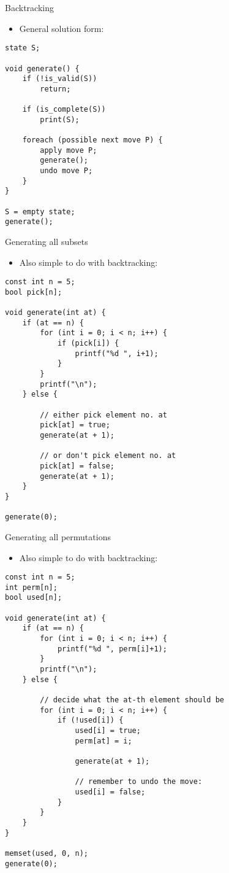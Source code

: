 \documentclass[12pt,t]{beamer}
\newcommand{\bi}{\begin{itemize}}
\newcommand{\ei}{\end{itemize}}
\begin{document}
\begin{frame}[fragile]{Backtracking}
    \vspace{10pt}
    \bi
        \item General solution form:
    \ei

    \begin{verbatim}
state S;

void generate() {
    if (!is_valid(S))
        return;

    if (is_complete(S))
        print(S);

    foreach (possible next move P) {
        apply move P;
        generate();
        undo move P;
    }
}

S = empty state;
generate();
    \end{verbatim}
\end{frame}


\begin{frame}[fragile]{Generating all subsets}
    \bi
        \item Also simple to do with backtracking:
    \ei
    \begin{verbatim}
const int n = 5;
bool pick[n];

void generate(int at) {
    if (at == n) {
        for (int i = 0; i < n; i++) {
            if (pick[i]) {
                printf("%d ", i+1);
            }
        }
        printf("\n");
    } else {

        // either pick element no. at
        pick[at] = true;
        generate(at + 1);

        // or don't pick element no. at
        pick[at] = false;
        generate(at + 1);
    }
}

generate(0);
    \end{verbatim}
\end{frame}


\begin{frame}[fragile]{Generating all permutations}
    \bi
        \item Also simple to do with backtracking:
    \ei
    \begin{verbatim}
const int n = 5;
int perm[n];
bool used[n];

void generate(int at) {
    if (at == n) {
        for (int i = 0; i < n; i++) {
            printf("%d ", perm[i]+1);
        }
        printf("\n");
    } else {

        // decide what the at-th element should be
        for (int i = 0; i < n; i++) {
            if (!used[i]) {
                used[i] = true;
                perm[at] = i;

                generate(at + 1);

                // remember to undo the move:
                used[i] = false;
            }
        }
    }
}

memset(used, 0, n);
generate(0);
    \end{verbatim}
\end{frame}
\end{document}
